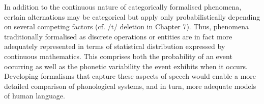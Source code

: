 \newpage 
In addition to the continuous nature of categorically formalised phenomena, certain alternations may be categorical but apply only probabilistically depending on several competing factors (cf. /t/ deletion in Chapter 7). Thus, phenomena traditionally formalised as discrete operations or entities are in fact more adequately represented in terms of statistical distribution expressed by continuous mathematics. This comprises both the probability of an event occurring as well as the phonetic variability the event exhibits when it occurs. Developing formalisms that capture these aspects of speech would enable a more detailed comparison of phonological systems, and in turn, more adequate models of human language. 
